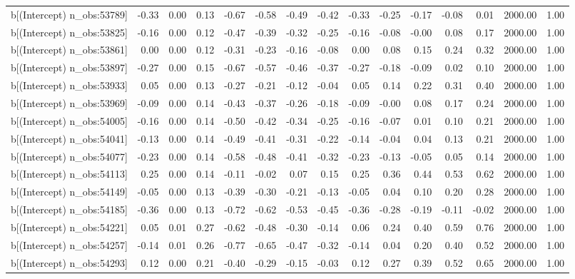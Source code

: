 \begin{table}[ht]
\begin{tabular}{rrrrrrrrrrrrrrr}
  b[(Intercept) n\_obs:53789] & -0.33 & 0.00 & 0.13 & -0.67 & -0.58 & -0.49 & -0.42 & -0.33 & -0.25 & -0.17 & -0.08 & 0.01 & 2000.00 & 1.00 \\ 
  b[(Intercept) n\_obs:53825] & -0.16 & 0.00 & 0.12 & -0.47 & -0.39 & -0.32 & -0.25 & -0.16 & -0.08 & -0.00 & 0.08 & 0.17 & 2000.00 & 1.00 \\ 
  b[(Intercept) n\_obs:53861] & 0.00 & 0.00 & 0.12 & -0.31 & -0.23 & -0.16 & -0.08 & 0.00 & 0.08 & 0.15 & 0.24 & 0.32 & 2000.00 & 1.00 \\ 
  b[(Intercept) n\_obs:53897] & -0.27 & 0.00 & 0.15 & -0.67 & -0.57 & -0.46 & -0.37 & -0.27 & -0.18 & -0.09 & 0.02 & 0.10 & 2000.00 & 1.00 \\ 
  b[(Intercept) n\_obs:53933] & 0.05 & 0.00 & 0.13 & -0.27 & -0.21 & -0.12 & -0.04 & 0.05 & 0.14 & 0.22 & 0.31 & 0.40 & 2000.00 & 1.00 \\ 
  b[(Intercept) n\_obs:53969] & -0.09 & 0.00 & 0.14 & -0.43 & -0.37 & -0.26 & -0.18 & -0.09 & -0.00 & 0.08 & 0.17 & 0.24 & 2000.00 & 1.00 \\ 
  b[(Intercept) n\_obs:54005] & -0.16 & 0.00 & 0.14 & -0.50 & -0.42 & -0.34 & -0.25 & -0.16 & -0.07 & 0.01 & 0.10 & 0.21 & 2000.00 & 1.00 \\ 
  b[(Intercept) n\_obs:54041] & -0.13 & 0.00 & 0.14 & -0.49 & -0.41 & -0.31 & -0.22 & -0.14 & -0.04 & 0.04 & 0.13 & 0.21 & 2000.00 & 1.00 \\ 
  b[(Intercept) n\_obs:54077] & -0.23 & 0.00 & 0.14 & -0.58 & -0.48 & -0.41 & -0.32 & -0.23 & -0.13 & -0.05 & 0.05 & 0.14 & 2000.00 & 1.00 \\ 
  b[(Intercept) n\_obs:54113] & 0.25 & 0.00 & 0.14 & -0.11 & -0.02 & 0.07 & 0.15 & 0.25 & 0.36 & 0.44 & 0.53 & 0.62 & 2000.00 & 1.00 \\ 
  b[(Intercept) n\_obs:54149] & -0.05 & 0.00 & 0.13 & -0.39 & -0.30 & -0.21 & -0.13 & -0.05 & 0.04 & 0.10 & 0.20 & 0.28 & 2000.00 & 1.00 \\ 
  b[(Intercept) n\_obs:54185] & -0.36 & 0.00 & 0.13 & -0.72 & -0.62 & -0.53 & -0.45 & -0.36 & -0.28 & -0.19 & -0.11 & -0.02 & 2000.00 & 1.00 \\ 
  b[(Intercept) n\_obs:54221] & 0.05 & 0.01 & 0.27 & -0.62 & -0.48 & -0.30 & -0.14 & 0.06 & 0.24 & 0.40 & 0.59 & 0.76 & 2000.00 & 1.00 \\ 
  b[(Intercept) n\_obs:54257] & -0.14 & 0.01 & 0.26 & -0.77 & -0.65 & -0.47 & -0.32 & -0.14 & 0.04 & 0.20 & 0.40 & 0.52 & 2000.00 & 1.00 \\ 
  b[(Intercept) n\_obs:54293] & 0.12 & 0.00 & 0.21 & -0.40 & -0.29 & -0.15 & -0.03 & 0.12 & 0.27 & 0.39 & 0.52 & 0.65 & 2000.00 & 1.00 \\ 

\end{tabular}
\end{table}
